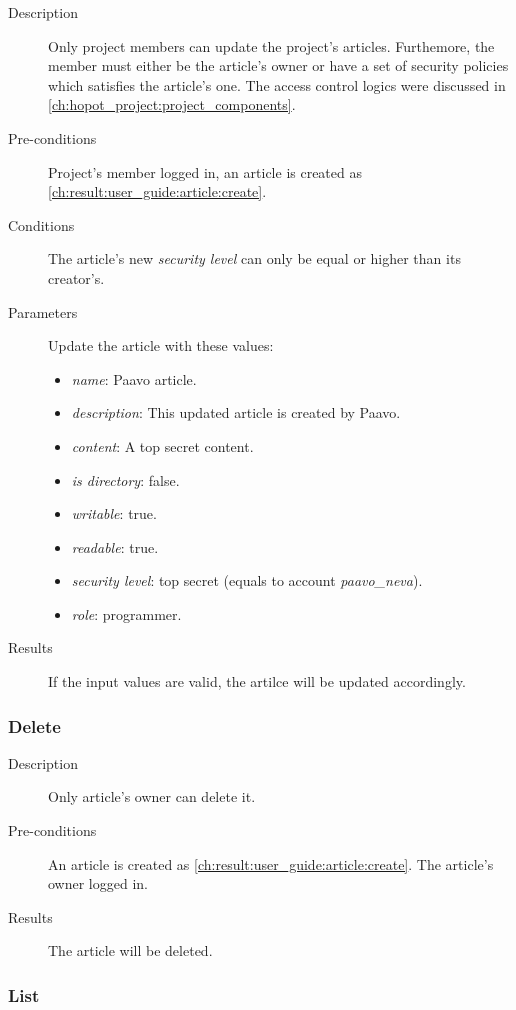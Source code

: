 \begin{description}
\item[Description] Only project members can update the project's articles.
Furthemore, the member must either be the article's owner or have a set of security policies which satisfies the article's one.
The access control logics were discussed in \autoref{ch:hopot_project:project_components}.
\item[Pre-conditions] Project's member logged in, an article is created as \autoref{ch:result:user_guide:article:create}.
\item[Conditions] The article's new \emph{security level} can only be equal or higher than its creator's.
\item[Parameters] Update the article with these values:
\begin{itemize}
\item \emph{name}: Paavo article.
\item \emph{description}: This updated article is created by Paavo.
\item \emph{content}: A top secret content.
\item \emph{is directory}: false.
\item \emph{writable}: true.
\item \emph{readable}: true.
\item \emph{security level}: top secret (equals to account \emph{paavo\_neva}).
\item \emph{role}: programmer.
\end{itemize}
\item[Results] If the input values are valid, the artilce will be updated accordingly.
\end{description}

\subsubsection{Delete}
\label{ch:result:user_guide:article:delete}

\begin{description}
\item[Description] Only article's owner can delete it.
\item[Pre-conditions] An article is created as \autoref{ch:result:user_guide:article:create}.
The article's owner logged in.
\item[Results] The article will be deleted.
\end{description}

\subsubsection{List}
\label{ch:result:user_guide:article:list}


